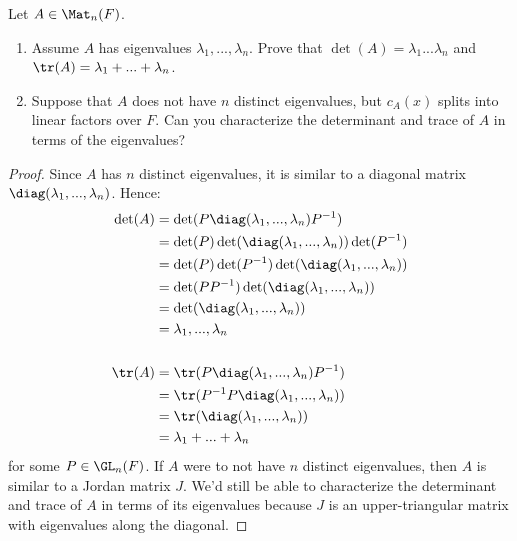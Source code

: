 \documentclass[10pt,twoside,openany]{memoir}
\begin{document}
        \begin{exercise}
            Let $A \in \Mat_n(F)$.
                \begin{enumerate}[label = (\alph*)]
                    \item Assume $A$ has eigenvalues $\lambda_1,...,\lambda_n$. Prove that $\det(A) = \lambda_1 ... \lambda_n$ and $\tr(A) = \lambda_1 + ... + \lambda_n$.
                    \item Suppose that $A$ does not have $n$ distinct eigenvalues, but $c_A(x)$ splits into linear factors over $F$. Can you characterize the determinant and trace of $A$ in terms of the eigenvalues?
                \end{enumerate}
        \end{exercise}
            \begin{proof}
               Since $A$ has $n$ distinct eigenvalues, it is similar to a diagonal matrix $\diag(\lambda_1,...,\lambda_n)$. Hence:
                    \begin{equation*}
                    \begin{split}
                        \det(A)
                        & = \det(P\diag(\lambda_1,...,\lambda_n)P^{-1}) \\
                        & = \det(P)\det(\diag(\lambda_1,...,\lambda_n))\det(P^{-1}) \\
                        & = \det(P)\det(P^{-1})\det(\diag(\lambda_1,...,\lambda_n)) \\
                        & = \det(PP^{-1})\det(\diag(\lambda_1,...,\lambda_n)) \\
                        & = \det(\diag(\lambda_1,...,\lambda_n)) \\
                        & = \lambda_1,...,\lambda_n \\
                        &\phantom{a} \\
                        \tr(A) &= \tr(P \diag(\lambda_1,...,\lambda_n) P^{-1}) \\
                        &= \tr(P^{-1}P \diag(\lambda_1,...,\lambda_n)) \\
                        &= \tr(\diag(\lambda_1,...,\lambda_n)) \\
                        &= \lambda_1 + ... + \lambda_n
                    \end{split}
                    \end{equation*}
                for some $P \in \GL_n(F)$. If $A$ were to not have $n$ distinct eigenvalues, then $A$ is similar to a Jordan matrix $J$. We'd still be able to characterize the determinant and trace of $A$ in terms of its eigenvalues because $J$ is an upper-triangular matrix with eigenvalues along the diagonal.
            \end{proof}
\end{document}
